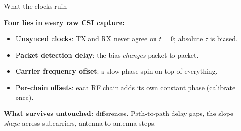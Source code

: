 \begin{frame}{What the clocks ruin}
  \vspace{0.3em}
  {\small\textbf{\textcolor{softgray}{Four lies in every raw CSI capture:}}\par}
  \vspace{0.3em}
  {\small
   \begin{itemize}\itemsep4pt
     \item \textbf{Unsynced clocks}: TX and RX never agree on $t = 0$;
       absolute $\tau$ is biased.
     \item \textbf{Packet detection delay}: the bias \emph{changes} packet to
       packet.
     \item \textbf{Carrier frequency offset}: a slow phase spin on top of
       everything.
     \item \textbf{Per-chain offsets}: each RF chain adds its own constant
       phase (calibrate once).
   \end{itemize}\par}

  \vspace{0.4em}
  {\small\textbf{\textcolor{softgreen}{What survives untouched:}} differences.
   Path-to-path delay gaps, the slope \emph{shape} across subcarriers,
   antenna-to-antenna steps.\par}

  \vspace{0.5em}
\end{frame}
